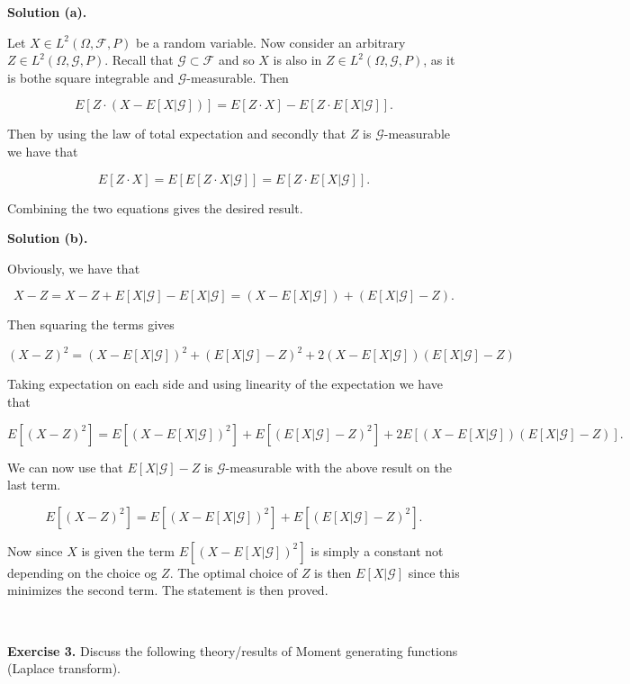 \documentclass[a4paper,12pt,openany]{book}
\begin{document}
\textbf{Solution (a).}

Let \(X\in L^2(\Omega,\mathcal{F},P)\) be a random variable. Now consider an arbitrary \(Z\in L^2(\Omega,\mathcal{G},P)\). Recall that \(\mathcal{G}\subset \mathcal{F}\) and so \(X\) is also in \(Z\in L^2(\Omega,\mathcal{G},P)\), as it is bothe square integrable and \(\mathcal{G}\)-measurable. Then

\[
E\left[Z\cdot(X-E[X\vert\mathcal{G}])\right]=E\left[Z\cdot X\right]-E\left[Z\cdot E[X\vert\mathcal{G}]\right].
\]

Then by using the law of total expectation and secondly that \(Z\) is \(\mathcal{G}\)-measurable we have that

\[
E\left[Z\cdot X\right]=E\left[E[Z\cdot X\vert\mathcal{G}]\right]=E\left[Z\cdot E[ X\vert\mathcal{G}]\right].
\]

Combining the two equations gives the desired result.

\textbf{Solution (b).}

Obviously, we have that

\[
X-Z=X-Z+E[X\vert\mathcal{G}]-E[X\vert\mathcal{G}]=(X-E[X\vert\mathcal{G}])+(E[X\vert\mathcal{G}]-Z).
\]

Then squaring the terms gives

\[
(X-Z)^2=(X-E[X\vert\mathcal{G}])^2+(E[X\vert\mathcal{G}]-Z)^2+2(X-E[X\vert\mathcal{G}])(E[X\vert\mathcal{G}]-Z)
\]

Taking expectation on each side and using linearity of the expectation we have that

\[
E[(X-Z)^2]=E\left[(X-E[X\vert\mathcal{G}])^2\right]+E\left[(E[X\vert\mathcal{G}]-Z)^2\right]+2E\left[(X-E[X\vert\mathcal{G}])(E[X\vert\mathcal{G}]-Z)\right].
\]

We can now use that \(E[X\vert\mathcal{G}]-Z\) is \(\mathcal{G}\)-measurable with the above result on the last term.

\[
E[(X-Z)^2]=E\left[(X-E[X\vert\mathcal{G}])^2\right]+E\left[(E[X\vert\mathcal{G}]-Z)^2\right].
\]

Now since \(X\) is given the term \(E\left[(X-E[X\vert\mathcal{G}])^2\right]\) is simply a constant not depending on the choice og \(Z\). The optimal choice of \(Z\) is then \(E[X\vert\mathcal{G}]\) since this minimizes the second term. The statement is then proved.

~

\textbf{Exercise 3.} Discuss the following theory/results of Moment generating functions (Laplace transform).
\end{document}
